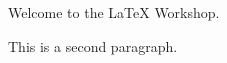 \documentclass{article}
\begin{document}
	Welcome to the LaTeX Workshop.

	This is a second paragraph.
\end{document}
